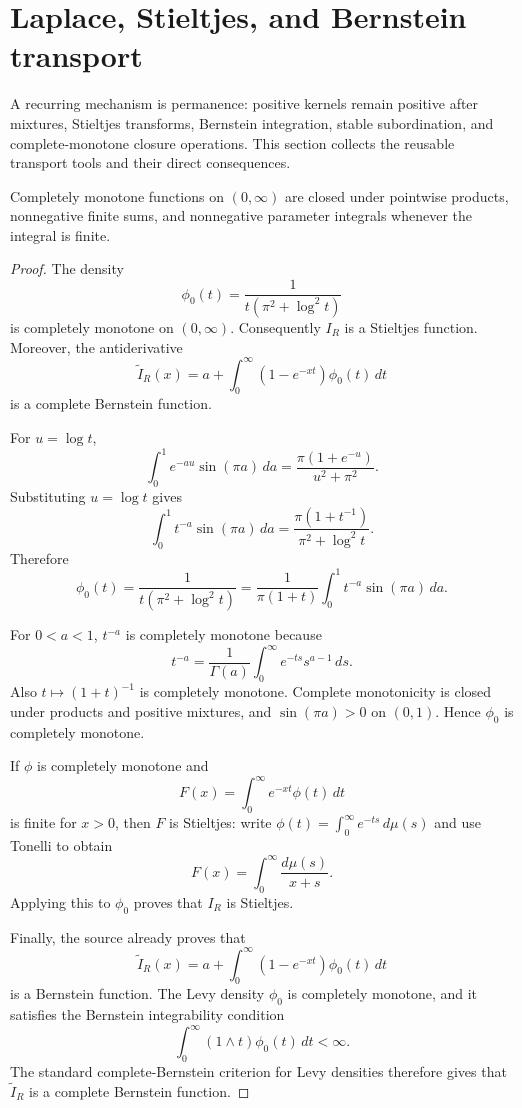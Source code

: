 \section{Laplace, Stieltjes, and Bernstein transport}
A recurring mechanism is permanence: positive kernels remain positive after mixtures, Stieltjes transforms, Bernstein integration, stable subordination, and complete-monotone closure operations.  This section collects the reusable transport tools and their direct consequences.
\begin{theorem}
\label{res:cm-closure-product-positive-mixture}
Completely monotone functions on \((0,\infty)\) are closed under pointwise products, nonnegative finite sums, and nonnegative parameter integrals whenever the integral is finite.
\end{theorem}
\begin{proof}
The density
\[
\phi_0(t)=\frac{1}{t(\pi^2+\log^2 t)}
\]
is completely monotone on \((0,\infty)\). Consequently \(I_R\) is a Stieltjes function. Moreover, the antiderivative
\[
\widetilde I_R(x)=a+\int_0^\infty (1-e^{-xt})\phi_0(t)\,dt
\]
is a complete Bernstein function.

For \(u=\log t\),
\[
\int_0^1 e^{-au}\sin(\pi a)\,da
=\frac{\pi(1+e^{-u})}{u^2+\pi^2}.
\]
Substituting \(u=\log t\) gives
\[
\int_0^1 t^{-a}\sin(\pi a)\,da
=\frac{\pi(1+t^{-1})}{\pi^2+\log^2 t}.
\]
Therefore
\[
\phi_0(t)
=\frac{1}{t(\pi^2+\log^2 t)}
=\frac{1}{\pi(1+t)}\int_0^1 t^{-a}\sin(\pi a)\,da.
\]

For \(0<a<1\), \(t^{-a}\) is completely monotone because
\[
t^{-a}=\frac1{\Gamma(a)}\int_0^\infty e^{-ts}s^{a-1}\,ds.
\]
Also \(t\mapsto(1+t)^{-1}\) is completely monotone. Complete monotonicity is closed under products and positive mixtures, and \(\sin(\pi a)>0\) on \((0,1)\). Hence \(\phi_0\) is completely monotone.

If \(\phi\) is completely monotone and
\[
F(x)=\int_0^\infty e^{-xt}\phi(t)\,dt
\]
is finite for \(x>0\), then \(F\) is Stieltjes: write \(\phi(t)=\int_0^\infty e^{-ts}\,d\mu(s)\) and use Tonelli to obtain
\[
F(x)=\int_0^\infty\frac{d\mu(s)}{x+s}.
\]
Applying this to \(\phi_0\) proves that \(I_R\) is Stieltjes.

Finally, the source already proves that
\[
\widetilde I_R(x)=a+\int_0^\infty (1-e^{-xt})\phi_0(t)\,dt
\]
is a Bernstein function. The Levy density \(\phi_0\) is completely monotone, and it satisfies the Bernstein integrability condition
\[
\int_0^\infty (1\wedge t)\phi_0(t)\,dt<\infty.
\]
The standard complete-Bernstein criterion for Levy densities therefore gives that \(\widetilde I_R\) is a complete Bernstein function.
\end{proof}

